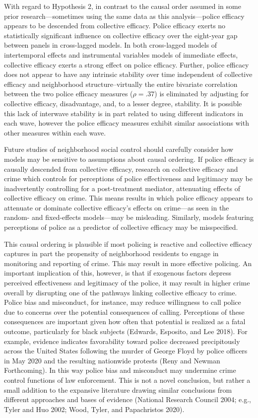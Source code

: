 \documentclass [11pt, proquest] {uwthesis}[2015/03/03]
\begin{document}
With regard to Hypothesis 2, in contrast to the causal order assumed in some prior research---sometimes using the same data as this analysis---police efficacy appears to be descended from collective efficacy. Police efficacy exerts no statistically significant influence on collective efficacy over the eight-year gap between panels in cross-lagged models. In both cross-lagged models of intertemporal effects and instrumental variables models of immediate effects, collective efficacy exerts a strong effect on police efficacy. Further, police efficacy does not appear to have any intrinsic stability over time independent of collective efficacy and neighborhood structure--virtually the entire bivariate correlation between the two police efficacy measures (\(\rho = .37\)) is eliminated by adjusting for collective efficacy, disadvantage, and, to a lesser degree, stability. It is possible this lack of interwave stability is in part related to using different indicators in each wave, however the police efficacy measures exhibit similar associations with other measures within each wave.

Future studies of neighborhood social control should carefully consider how models may be sensitive to assumptions about causal ordering. If police efficacy is causally descended from collective efficacy, research on collective efficacy and crime which controls for perceptions of police effectiveness and legitimacy may be inadvertently controlling for a post-treatment mediator, attenuating effects of collective efficacy on crime. This means results in which police efficacy appears to attenuate or dominate collective efficacy's effects on crime---as seen in the random- and fixed-effects models---may be misleading. Similarly, models featuring perceptions of police as a predictor of collective efficacy may be misspecified.

This causal ordering is plausible if most policing is reactive and collective efficacy captures in part the propensity of neighborhood residents to engage in monitoring and reporting of crime. This may result in more effective policing. An important implication of this, however, is that if exogenous factors depress perceived effectiveness and legitimacy of the police, it may result in higher crime overall by disrupting one of the pathways linking collective efficacy to crime. Police bias and misconduct, for instance, may reduce willingness to call police due to concerns over the potential consequences of calling. Perceptions of these consequences are important given how often that potential is realized as a fatal outcome, particularly for black subjects (Edwards, Esposito, and Lee 2018). For example, evidence indicates favorability toward police decreased precipitously across the United States following the murder of George Floyd by police officers in May 2020 and the resulting nationwide protests (Reny and Newman Forthcoming). In this way police bias and misconduct may undermine crime control functions of law enforcement. This is not a novel conclusion, but rather a small addition to the expansive literature drawing similar conclusions from different approaches and bases of evidence (National Research Council 2004; e.g., Tyler and Huo 2002; Wood, Tyler, and Papachristos 2020).
\end{document}
